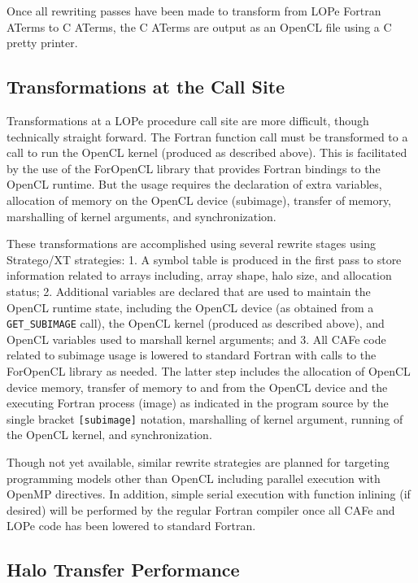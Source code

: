 Once all rewriting passes have been made to transform from LOPe Fortran ATerms to C ATerms, the
C ATerms are output as an OpenCL file using a C pretty printer.

\subsection{Transformations at the Call Site}

Transformations at a LOPe procedure call site are more difficult, though technically straight forward.
The Fortran function call must be transformed to a call to run the OpenCL kernel (produced as described
above).  This is facilitated by the use of the ForOpenCL library that provides Fortran bindings to the
OpenCL runtime\cite{foropencl}.  But the usage requires the declaration of extra variables,
allocation of memory on the OpenCL device (subimage), transfer of memory, marshalling of kernel
arguments, and synchronization.

These transformations are accomplished using several rewrite stages using Stratego/XT strategies:
1. A symbol table is produced in the first pass to store information related to arrays including,
array shape, halo size, and allocation status;
2. Additional variables are declared that are used to maintain the OpenCL runtime state, including
the OpenCL device (as obtained from a \texttt{GET\_SUBIMAGE} call), the OpenCL kernel (produced as
described above), and OpenCL variables used to marshall kernel arguments; and
3. All CAFe code related to subimage usage is lowered to standard Fortran with calls to the
ForOpenCL library as needed.  The latter step includes the allocation of OpenCL device memory,
transfer of memory to and from the OpenCL device and the executing Fortran process (image) as
indicated in the program source by the single bracket \texttt{[subimage]} notation, marshalling
of kernel argument, running of the OpenCL kernel, and synchronization.

Though not yet available, similar rewrite strategies are planned for targeting programming models
other than OpenCL including parallel execution with OpenMP directives.  In addition, simple serial
execution with function inlining (if desired) will be performed by the regular Fortran compiler once
all CAFe and LOPe code has been lowered to standard Fortran.

\subsection{Halo Transfer Performance}

